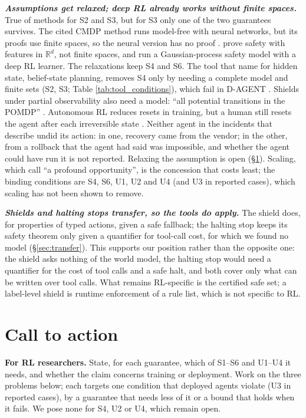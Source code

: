 \documentclass{article}
\begin{document}
\textbf{\emph{Assumptions get relaxed; deep RL already works without finite spaces.}} True of methods for S2 and S3, but for S3 only one of the two guarantees survives. The cited CMDP method runs model-free with neural networks, but its proofs use finite spaces, so the neural version has no proof \citep{satija2020}. \citet{wachi2023} prove safety with features in \(\mathbb{R}^d\), not finite spaces, and run a Gaussian-process safety model with a deep RL learner. The relaxations keep S4 and S6. The tool that \citet{mclean2026} name for hidden state, belief-state planning, removes S4 only by needing a complete model and finite sets (S2, S3; Table \ref{tab:tool_conditions}), which fail in D-AGENT \citep{kaelbling1998}. Shields under partial observability also need a model: ``all potential transitions in the POMDP'' \citep{carr2022}. Autonomous RL reduces resets in training, but a human still resets the agent after each irreversible state \citep{lee2025}. Neither agent in the incidents that \citet{mclean2026} describe undid its action: in one, recovery came from the vendor; in the other, from a rollback that the agent had said was impossible, and whether the agent could have run it is not reported. Relaxing the assumption is open (§\ref{sec:action}). Scaling, which \citet[§5]{mclean2026} call ``a profound opportunity'', is the concession that costs least; the binding conditions are S4, S6, U1, U2 and U4 (and U3 in reported cases), which scaling has not been shown to remove.

\textbf{\emph{Shields and halting stops transfer, so the tools do apply.}} The shield does, for properties of typed actions, given a safe fallback; the halting stop keeps its safety theorem only given a quantifier for tool-call cost, for which we found no model (§\ref{sec:transfer}). This supports our position rather than the opposite one: the shield asks nothing of the world model, the halting stop would need a quantifier for the cost of tool calls and a safe halt, and both cover only what can be written over tool calls. What remains RL-specific is the certified safe set; a label-level shield is runtime enforcement of a rule list, which is not specific to RL.

\hypertarget{sec:action}{%
\section{Call to action}\label{sec:action}}

\textbf{For RL researchers.} State, for each guarantee, which of S1--S6 and U1--U4 it needs, and whether the claim concerns training or deployment. Work on the three problems below; each targets one condition that deployed agents violate (U3 in reported cases), by a guarantee that needs less of it or a bound that holds when it fails. We pose none for S4, U2 or U4, which remain open.
\end{document}
